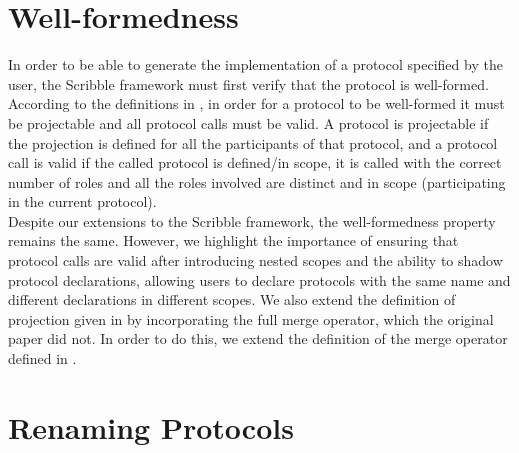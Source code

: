 \documentclass[12pt,twoside]{report}
\begin{document}
\section{Well-formedness}
In order to be able to generate the implementation of a protocol specified by the user, the Scribble framework must first verify that the protocol is well-formed.\\ According to the definitions in \cite{featherweight, nestedprotocols}, in order for a protocol to be well-formed it must be projectable and all protocol calls must be valid. A protocol is projectable if the projection is defined for all the participants of that protocol, and a protocol call is valid if the called protocol is defined/in scope, it is called with the correct number of roles and all the roles involved are distinct and in scope (participating in the current protocol).\\

Despite our extensions to the Scribble framework, the well-formedness property remains the same. However, we highlight the importance of ensuring that protocol calls are valid after introducing nested scopes and the ability to shadow protocol declarations, allowing users to declare protocols with the same name and different declarations in different scopes. We also extend the definition of projection given in \cite{nestedprotocols} by incorporating the full merge operator, which the original paper did not. In order to do this, we extend the definition of the merge operator defined in \cite{featherweight}.


\section{Renaming Protocols}\label{renaming}
\end{document}
